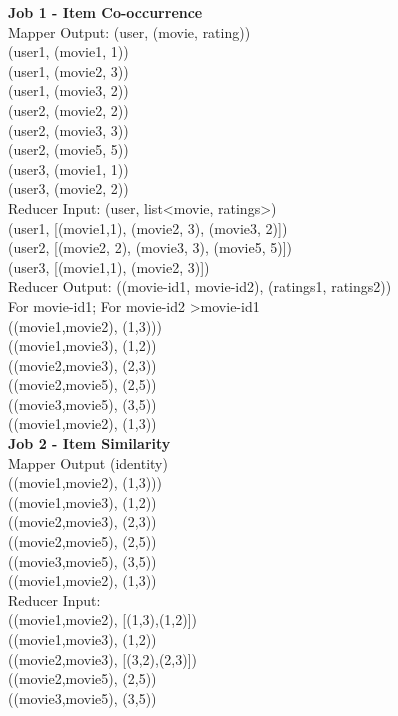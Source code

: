 \documentclass{article}
\begin{document}
\begin{itemize}
\begin{itemize}
			\textbf{Job 1 - Item Co-occurrence} \\
			Mapper Output: (user, (movie, rating))\\
			(user1, (movie1, 1))\\
			(user1, (movie2, 3))\\
			(user1, (movie3, 2))\\
			(user2, (movie2, 2))\\
			(user2, (movie3, 3))\\
			(user2, (movie5, 5))\\
			(user3, (movie1, 1))\\
			(user3, (movie2, 2))\\
			
			Reducer Input: (user, list\textless movie, ratings\textgreater)\\
			(user1, [(movie1,1), (movie2, 3), (movie3, 2)])\\
			(user2, [(movie2, 2), (movie3, 3), (movie5, 5)])\\
			(user3, [(movie1,1), (movie2, 3)])\\
			
			Reducer Output: ((movie-id1, movie-id2), (ratings1, ratings2))\\
			For movie-id1; For movie-id2 \textgreater movie-id1 \\
			((movie1,movie2), (1,3)))\\
			((movie1,movie3), (1,2))\\
			((movie2,movie3), (2,3))\\
			((movie2,movie5), (2,5))\\
			((movie3,movie5), (3,5))\\
			((movie1,movie2), (1,3))\\
			  
			\textbf{Job 2 - Item Similarity}\\
			Mapper Output (identity)\\
			((movie1,movie2), (1,3)))\\
			((movie1,movie3), (1,2))\\
			((movie2,movie3), (2,3))\\
			((movie2,movie5), (2,5))\\
			((movie3,movie5), (3,5))\\
			((movie1,movie2), (1,3))\\
			  
			Reducer Input:\\
			((movie1,movie2), [(1,3),(1,2)])\\ 
			((movie1,movie3), (1,2))\\
			((movie2,movie3), [(3,2),(2,3)])\\
			((movie2,movie5), (2,5))\\
			((movie3,movie5), (3,5))\\
			

\end{itemize}
\end{itemize}
\end{document}
